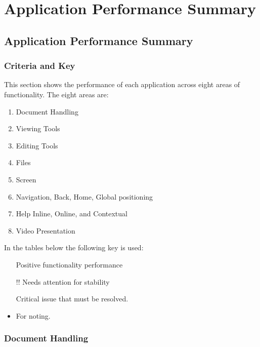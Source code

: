 

\chapter{Application Performance Summary\label{App:PerformanceSummary}}





\section{Application Performance Summary}
\subsection{Criteria and Key}
This section shows the performance of each application across eight areas of functionality. The eight areas are:
\begin{enumerate}
    \item Document Handling
    \item Viewing Tools
    \item Editing Tools
    \item Files
    \item Screen
    \item Navigation, Back, Home, Global positioning
    \item Help Inline, Online, and Contextual
    \item Video Presentation
    
    
\end{enumerate}

\noindent In the tables below the following key is used:
\begin{itemize}
	\item[\color{green}\tick]\color{black} Positive functionality performance
    \item [\color{amber}!!]\color{black} Needs attention for stability
     \item [\color{red}\cross]\color{black} Critical issue that must be resolved.
     \item For noting.
\end{itemize}
\subsection{Document Handling}
\singlespace


